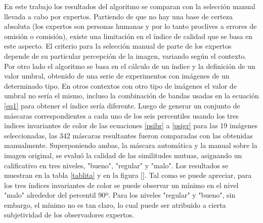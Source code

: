 En este trabajo los resultados del algoritmo se comparan con la selección manual llevada a cabo por expertos. Partiendo de que no hay una base de certeza absoluta (los expertos son personas humanas y por lo tanto proclives a errores de omisión o comisión), existe una limitación en el índice de calidad que se basa en este aspecto. El criterio para la selección manual de parte de los expertos depende de su particular percepción de la imagen, variando según el contexto. Por otro lado el algoritmo se basa en el cálculo de un índice y la definición de un valor umbral, obtenido de una serie de experimentos con imágenes de un determinado tipo. En otros contextos con otro tipo de imágenes el valor de umbral no sería el mismo, incluso la combinación de bandas usadas en la ecuación \ref{eq1} para obtener el índice sería diferente.
Luego de generar un conjunto de máscaras correspondientes a cada uno de los seis percentiles usando los tres índices invariantes de color de las ecuaciones \ref{psibr} a \ref{psigr} para las 19 imágenes seleccionadas, las 342 máscaras resultantes fueron comparadas con las obtenidas manualmente. Superponiendo ambas, la máscara automática y la manual sobre la imagen original, se evaluó la calidad de las similitudes mutuas, asignando un calificativo en tres niveles, "bueno", "regular" y "malo". Los resultados se muestran en la tabla \ref{tablita} y en la figura \ref{}. Tal como se puede apreciar, para los tres índices invariantes de color se puede observar un mínimo en el nivel "malo" alrededor del percentil 90º. Para los niveles "regular" y "bueno", sin embargo, el mínimo no es tan claro, lo cual puede ser atribuido a cierta subjetividad de los observadores expertos.

